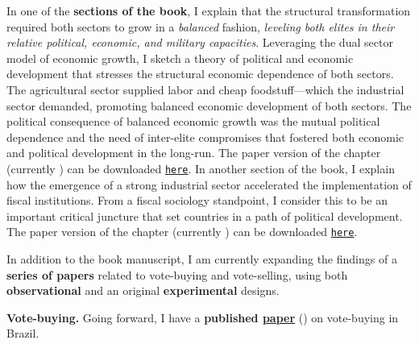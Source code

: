 \documentclass[10pt,stdletter,dateno,sigleft]{newlfm} %
\begin{document}
\begin{newlfm}
In one of the {\bf sections of the book}, I explain that the structural transformation required both sectors to grow in a \emph{balanced} fashion, \emph{leveling both elites in their relative political, economic, and military capacities}. Leveraging the dual sector model of economic growth, I sketch a theory of political and economic development that stresses the structural economic dependence of both sectors. The agricultural sector supplied labor and cheap foodstuff---which the industrial sector demanded, promoting balanced economic development of both sectors. The political consequence of balanced economic growth was the mutual political dependence and the need of inter-elite compromises that fostered both economic and political development in the long-run. The paper version of the chapter (currently \emph{\unskip}) can be downloaded \href{https://github.com/hbahamonde/Negative_Link_Paper/raw/master/Bahamonde_NegativeLink.pdf}{\texttt{here}}. In another section of the book, I explain how the emergence of a strong industrial sector accelerated the implementation of fiscal institutions. From a fiscal sociology standpoint, I consider this to be an important critical juncture that set countries in a path of political development. The paper version of the chapter (currently \emph{\unskip}) can be downloaded \href{http://github.com/hbahamonde/IncomeTaxAdoption/raw/master/Bahamonde_IncomeTaxAdoption.pdf}{\texttt{here}}. 


In addition to the book manuscript, I am currently expanding the findings of a {\bf series of papers} related to vote-buying and vote-selling, using both {\bf observational} and an original {\bf experimental} designs.



{\bf Vote-buying.} Going forward, I have a {\bf published \href{https://github.com/hbahamonde/Clientelism_paper/raw/master/Bahamonde_Clientelism_Paper.pdf}{paper}} (\emph{\unskip}) on vote-buying in Brazil. \unskip




\end{newlfm}
\end{document}
